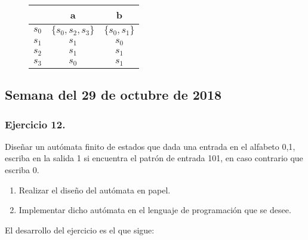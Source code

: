\documentclass[11pt,a4paper]{article}
\begin{document}
	\begin{figure}[H]
	\centering
	\begin{tabular}{|c|c c|}
		\hline
			 & a & b \\
		\hline
			$s_0$ & $\{s_0,s_2,s_3\}$ & $\{s_0,s_1\}$ \\
			$s_1$ & $s_1$ & $s_0$ \\
			$s_2$ & $s_1$ & $s_1$ \\
			$s_3$ & $s_0$ & $s_1$ \\
		\hline
	
	\end{tabular}
	\end{figure}
	
\begin{figure}[H]
\centering
{}
\end{figure}	

\subsection{Semana del 29 de octubre de 2018}

\subsubsection{Ejercicio 12.} Diseñar un autómata finito de estados que dada una entrada en el alfabeto {0,1}, escriba en la salida 1 si encuentra el patrón de entrada 101, en caso contrario que escriba 0.
	\begin{enumerate}
	\item Realizar el diseño del autómata en papel.
	\item Implementar dicho autómata en el lenguaje de 				programación que se desee.
	\end{enumerate}
	
El desarrollo del ejercicio es el que sigue:
	
\end{document}
